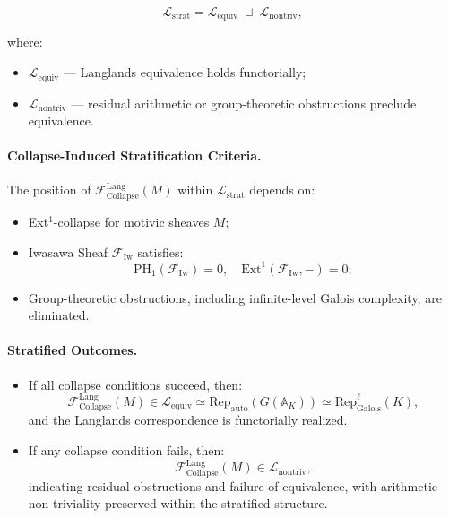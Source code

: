 \documentclass[11pt]{article}
\begin{document}
\[
\mathcal{L}_{\mathrm{strat}} = \mathcal{L}_{\mathrm{equiv}} \;\sqcup\; \mathcal{L}_{\mathrm{nontriv}},
\]

where:

\begin{itemize}
    \item \( \mathcal{L}_{\mathrm{equiv}} \) — Langlands equivalence holds functorially;
    \item \( \mathcal{L}_{\mathrm{nontriv}} \) — residual arithmetic or group-theoretic obstructions preclude equivalence.
\end{itemize}

\paragraph{Collapse-Induced Stratification Criteria.}

The position of \( \mathcal{F}_{\mathrm{Collapse}}^{\mathrm{Lang}}(M) \) within \( \mathcal{L}_{\mathrm{strat}} \) depends on:

\begin{itemize}
    \item Ext$^1$-collapse for motivic sheaves \( M \);
    \item Iwasawa Sheaf \( \mathcal{F}_{\mathrm{Iw}} \) satisfies:
    \[
    \mathrm{PH}_1(\mathcal{F}_{\mathrm{Iw}}) = 0, \quad \mathrm{Ext}^1(\mathcal{F}_{\mathrm{Iw}}, -) = 0;
    \]
    \item Group-theoretic obstructions, including infinite-level Galois complexity, are eliminated.
\end{itemize}

\paragraph{Stratified Outcomes.}

\begin{itemize}
    \item If all collapse conditions succeed, then:
    \[
    \mathcal{F}_{\mathrm{Collapse}}^{\mathrm{Lang}}(M) \in \mathcal{L}_{\mathrm{equiv}} \simeq \mathrm{Rep}_{\mathrm{auto}}(G(\mathbb{A}_K)) \simeq \mathrm{Rep}_{\mathrm{Galois}}^\ell(K),
    \]
    and the Langlands correspondence is functorially realized.

    \item If any collapse condition fails, then:
    \[
    \mathcal{F}_{\mathrm{Collapse}}^{\mathrm{Lang}}(M) \in \mathcal{L}_{\mathrm{nontriv}},
    \]
    indicating residual obstructions and failure of equivalence, with arithmetic non-triviality preserved within the stratified structure.
\end{itemize}
\end{document}

